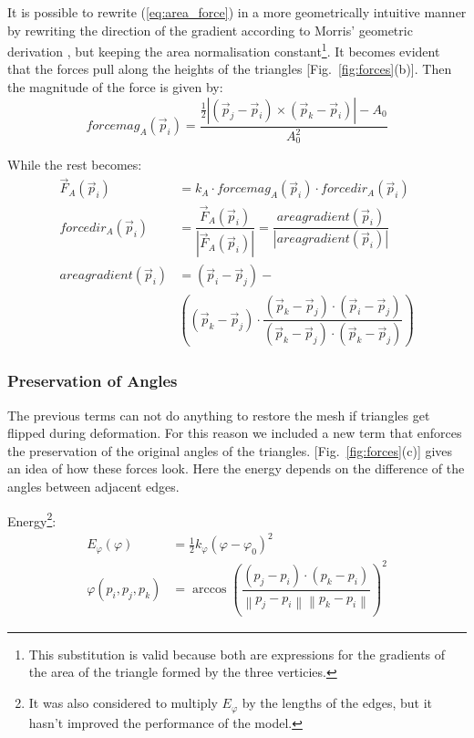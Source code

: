 \documentclass[journal]{IEEEtran}
\newcommand{\eref}[1]{(\ref{#1})}
\newcommand{\fref}[1]{Fig.~\ref{#1}}
\begin{document}
It is possible to rewrite \eref{eq:area_force} in a more geometrically intuitive manner by rewriting the direction of the gradient according to Morris' geometric derivation \cite{Morris2008}, but keeping the area normalisation constant\footnote{This substitution is valid because both are expressions for the gradients of the area of the triangle formed by the three verticies.}.  It becomes evident that the forces pull along the heights of the triangles [\fref{fig:forces}(b)].  Then the magnitude of the force is given by:
\begin{equation}
 forcemag_A(\vec{p}_i)= \frac{\frac{1}{2}|(\vec{p}_j-\vec{p}_i)\times(\vec{p}_k-\vec{p}_i)|-A_0}{A_0^2}
\end{equation}

While the rest becomes:
\begin{align}
 \vec{F}_A(\vec{p}_i) & = k_A \cdot forcemag_A(\vec{p}_i) \cdot forcedir_A(\vec{p}_i) \nonumber \\
 forcedir_A(\vec{p}_i) & = \dfrac{\vec{F}_A(\vec{p}_i)}{|\vec{F}_A(\vec{p}_i)|} = \dfrac{areagradient(\vec{p}_i)}{|areagradient(\vec{p}_i)|} \nonumber \\
 areagradient(\vec{p}_i) & = (\vec{p}_i-\vec{p}_j)- \nonumber \\
 & \left( (\vec{p}_k-\vec{p}_j) \cdot \dfrac{(\vec{p}_k-\vec{p}_j) \cdot (\vec{p}_i-\vec{p}_j)}{(\vec{p}_k-\vec{p}_j) \cdot (\vec{p}_k-\vec{p}_j)} \right)
\end{align}

\subsubsection{Preservation of Angles}
The previous terms can not do anything to restore the mesh if triangles get flipped during deformation.  For this reason we included a new term that enforces the preservation of the original angles of the triangles.  [\fref{fig:forces}(c)] gives an idea of how these forces look.  Here the energy depends on the difference of the angles between adjacent edges.

Energy\footnote{It was also considered to multiply $E_\varphi$ by the lengths of the edges, but it hasn't improved the performance of the model.}:
\begin{align}
 E_\varphi(\varphi) & = \frac{1}{2}k_\varphi(\varphi - \varphi_0)^2 \\
 \varphi(p_i,p_j,p_k) & = \arccos \left( \dfrac{(p_j - p_i) \cdot (p_k - p_i)}{ \left\| p_j - p_i \right\| \left\|p_k - p_i \right\|} \right)^2 \nonumber
\end{align}
\end{document}
